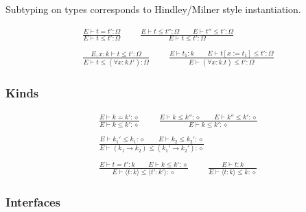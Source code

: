 \documentclass[twoside]{article}
\begin{document}
Subtyping on types corresponds to Hindley/Milner style instantiation.

\begin{displaymath}
\begin{array}{c}
\displaystyle
\frac{
E \vdash t = t' : \Omega
}{
E \vdash t \leq t' : \Omega
}
\qquad
\frac{
E \vdash t \leq t'' : \Omega
\qquad
E \vdash t'' \leq t' : \Omega
}{
E \vdash t \leq t' : \Omega
}
\\\\\displaystyle
\frac{
E,x:k \vdash t \leq t' : \Omega
}{
E \vdash t \leq (\forall x:k.t') : \Omega
}
\qquad
\frac{
E \vdash t_1 : k
\qquad
E \vdash t[x:=t_1] \leq t' : \Omega
}{
E \vdash (\forall x:k.t) \leq t' : \Omega
}
\end{array}
\end{displaymath}


\subsubsection*{Kinds \hfill
{}
}

\begin{displaymath}
\begin{array}{c}
\displaystyle
\frac{
E \vdash k = k' : \diamond
}{
E \vdash k \leq k' : \diamond
}
\qquad
\frac{
E \vdash k \leq k'' : \diamond
\qquad
E \vdash k'' \leq k' : \diamond
}{
E \vdash k \leq k' : \diamond
}
\\\\\displaystyle
\frac{
E \vdash k_1' \leq k_1 : \diamond
\qquad
E \vdash k_2 \leq k_2' : \diamond
}{
E \vdash (k_1\to k_2) \leq (k_1'\to k_2') : \diamond
}
\\\\\displaystyle
\frac{
E \vdash t = t' : k
\qquad
E \vdash k \leq k' : \diamond
}{
E \vdash \langle t:k\rangle \leq \langle t':k'\rangle : \diamond
}
\qquad
\frac{
E \vdash t : k
}{
E \vdash \langle t:k\rangle \leq k : \diamond
}
\end{array}
\end{displaymath}



\subsubsection*{Interfaces \hfill
{}
}
\end{document}
